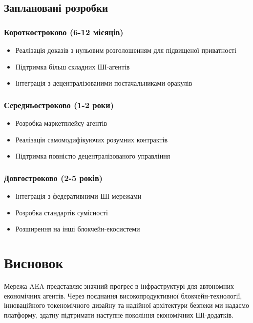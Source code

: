 \documentclass[12pt,a4paper]{article}
\begin{document}
\subsection{Заплановані розробки}

\subsubsection{Короткостроково (6-12 місяців)}
\begin{itemize}
\item Реалізація доказів з нульовим розголошенням для підвищеної приватності
\item Підтримка більш складних ШІ-агентів
\item Інтеграція з децентралізованими постачальниками оракулів
\end{itemize}

\subsubsection{Середньостроково (1-2 роки)}
\begin{itemize}
\item Розробка маркетплейсу агентів
\item Реалізація самомодифікуючих розумних контрактів
\item Підтримка повністю децентралізованого управління
\end{itemize}

\subsubsection{Довгостроково (2-5 років)}
\begin{itemize}
\item Інтеграція з федеративними ШІ-мережами
\item Розробка стандартів сумісності
\item Розширення на інші блокчейн-екосистеми
\end{itemize}

\section{Висновок}

Мережа AEA представляє значний прогрес в інфраструктурі для автономних економічних агентів. Через поєднання високопродуктивної блокчейн-технології, інноваційного токеномічного дизайну та надійної архітектури безпеки ми надаємо платформу, здатну підтримати наступне покоління економічних ШІ-додатків.
\end{document}
